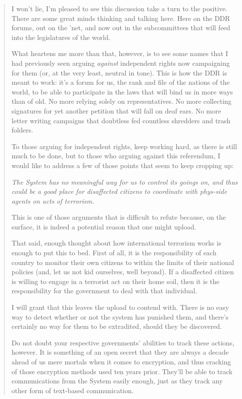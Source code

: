 \begin{quote}
I won't lie, I'm pleased to see this discussion take a turn to the positive. There are some great minds thinking and talking here. Here on the DDR forums, out on the 'net, and now out in the subcommittees that will feed into the legislatures of the world.

What heartens me more than that, however, is to see some names that I had previously seen arguing \emph{against} independent rights now campaigning for them (or, at the very least, neutral in tone). This is how the DDR is meant to work: it's a forum for us, the rank and file of the nations of the world, to be able to participate in the laws that will bind us in more ways than of old. No more relying solely on representatives. No more collecting signatures for yet another petition that will fall on deaf ears. No more letter writing campaigns that doubtless fed countless shredders and trash folders.

To those arguing for independent rights, keep working hard, as there is still much to be done, but to those who arguing against this referendum, I would like to address a few of those points that seem to keep cropping up:

\emph{The System has no meaningful way for us to control its goings on, and thus could be a good place for disaffected citizens to coordinate with phys-side agents on acts of terrorism.}

This is one of those arguments that is difficult to refute because, on the surface, it is indeed a potential reason that one might upload.

That said, enough thought about how international terrorism works is enough to put this to bed. First of all, it is the responsibility of each country to monitor their own citizens to within the limits of their national policies (and, let us not kid ourselves, well beyond). If a disaffected citizen is willing to engage in a terrorist act on their home soil, then it is the responsibility for the government to deal with that individual.

I will grant that this leaves the upload to contend with. There is no easy way to detect whether or not the system has punished them, and there's certainly no way for them to be extradited, should they be discovered.

Do not doubt your respective governments' abilities to track these actions, however. It is something of an open secret that they are always a decade ahead of us mere mortals when it comes to encryption, and thus cracking of those encryption methods used ten years prior. They'll be able to track communications from the System easily enough, just as they track any other form of text-based communication.


\end{quote}
